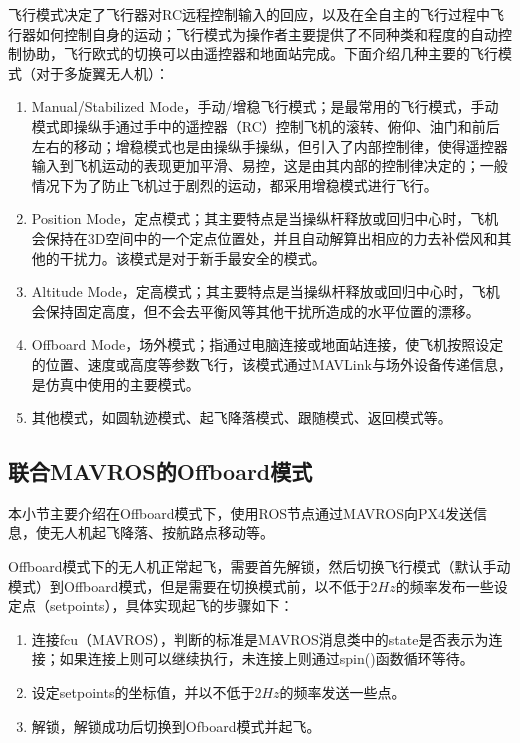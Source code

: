 飞行模式决定了飞行器对RC远程控制输入的回应，以及在全自主的飞行过程中飞行器如何控制自身的运动；飞行模式为操作者主要提供了不同种类和程度的自动控制协助，飞行欧式的切换可以由遥控器和地面站完成。下面介绍几种主要的飞行模式（对于多旋翼无人机）：
\begin{enumerate}
	\item 
	Manual/Stabilized Mode，手动/增稳飞行模式；是最常用的飞行模式，手动模式即操纵手通过手中的遥控器（RC）控制飞机的滚转、俯仰、油门和前后左右的移动；增稳模式也是由操纵手操纵，但引入了内部控制律，使得遥控器输入到飞机运动的表现更加平滑、易控，这是由其内部的控制律决定的；一般情况下为了防止飞机过于剧烈的运动，都采用增稳模式进行飞行。
	\item 
	Position Mode，定点模式；其主要特点是当操纵杆释放或回归中心时，飞机会保持在3D空间中的一个定点位置处，并且自动解算出相应的力去补偿风和其他的干扰力。该模式是对于新手最安全的模式。
	\item
	Altitude Mode，定高模式；其主要特点是当操纵杆释放或回归中心时，飞机会保持固定高度，但不会去平衡风等其他干扰所造成的水平位置的漂移。
	\item 
	Offboard Mode，场外模式；指通过电脑连接或地面站连接，使飞机按照设定的位置、速度或高度等参数飞行，该模式通过MAVLink与场外设备传递信息，是仿真中使用的主要模式。
	\item 
	其他模式，如圆轨迹模式、起飞降落模式、跟随模式、返回模式等。
\end{enumerate}

\subsection{联合MAVROS的Offboard模式} \label{2.2.3}
本小节主要介绍在Offboard模式下，使用ROS节点通过MAVROS向PX4发送信息，使无人机起飞降落、按航路点移动等。

Offboard模式下的无人机正常起飞，需要首先解锁，然后切换飞行模式（默认手动模式）到Offboard模式，但是需要在切换模式前，以不低于2$Hz$的频率发布一些设定点（setpoints），具体实现起飞的步骤如下：

\begin{enumerate}
	\item 
	连接fcu（MAVROS），判断的标准是MAVROS消息类中的state是否表示为连接；如果连接上则可以继续执行，未连接上则通过spin()函数循环等待。
	\item 
	设定setpoints的坐标值，并以不低于2$Hz$的频率发送一些点。
	\item 
	解锁，解锁成功后切换到Ofboard模式并起飞。
\end{enumerate}









